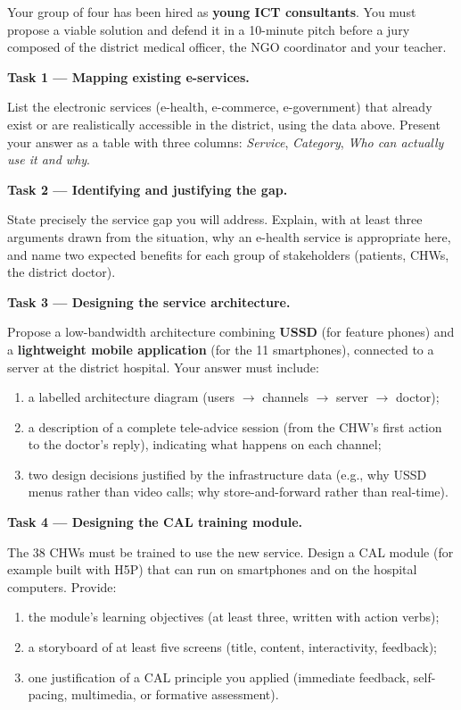 \documentclass[11pt]{article}
\newcounter{popsec}
\newcounter{popsub}
\newcommand{\courssub}[1]{%
  \stepcounter{popsub}%
  \par\vspace{9pt}\noindent{\popxbold\fontsize{11.5}{13}\selectfont\color{popink}{\color{poporange}\thepopsec.\thepopsub}\hspace{6pt}#1}\par\nopagebreak\vspace{4pt}
}
\begin{document}
Your group of four has been hired as \textbf{young ICT consultants}. You must propose a viable solution and defend it in a 10-minute pitch before a jury composed of the district medical officer, the NGO coordinator and your teacher.

\courssub{Tasks}

\textbf{Task 1 — Mapping existing e-services.}\par
List the electronic services (e-health, e-commerce, e-government) that already exist or are realistically accessible in the district, using the data above. Present your answer as a table with three columns: \emph{Service}, \emph{Category}, \emph{Who can actually use it and why}.

\textbf{Task 2 — Identifying and justifying the gap.}\par
State precisely the service gap you will address. Explain, with at least three arguments drawn from the situation, why an e-health service is appropriate here, and name two expected benefits for each group of stakeholders (patients, CHWs, the district doctor).

\textbf{Task 3 — Designing the service architecture.}\par
Propose a low-bandwidth architecture combining \textbf{USSD} (for feature phones) and a \textbf{lightweight mobile application} (for the 11 smartphones), connected to a server at the district hospital. Your answer must include:
\begin{enumerate}
\item a labelled architecture diagram (users $\rightarrow$ channels $\rightarrow$ server $\rightarrow$ doctor);
\item a description of a complete tele-advice session (from the CHW's first action to the doctor's reply), indicating what happens on each channel;
\item two design decisions justified by the infrastructure data (e.g., why USSD menus rather than video calls; why store-and-forward rather than real-time).
\end{enumerate}

\textbf{Task 4 — Designing the CAL training module.}\par
The 38 CHWs must be trained to use the new service. Design a CAL module (for example built with H5P) that can run on smartphones and on the hospital computers. Provide:
\begin{enumerate}
\item the module's learning objectives (at least three, written with action verbs);
\item a storyboard of at least five screens (title, content, interactivity, feedback);
\item one justification of a CAL principle you applied (immediate feedback, self-pacing, multimedia, or formative assessment).
\end{enumerate}
\end{document}
